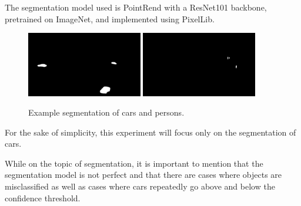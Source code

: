 \par
The segmentation model used is PointRend\cite{pointrend} with a ResNet101\cite{resnet} backbone, pretrained on ImageNet\cite{imagenet}, and implemented using PixelLib\cite{pixellib}.
\begin{figure}[H]
    \centering
    \includegraphics[width=0.45\textwidth]{resources/methodology/car_segmentation.png}
    \includegraphics[width=0.45\textwidth]{resources/methodology/person_segmentation.png}
    \caption{Example segmentation of cars and persons.}
\end{figure}
For the sake of simplicity, this experiment will focus only on the segmentation of cars.
\par
While on the topic of segmentation, it is important to mention that the segmentation model is not perfect and that there are cases where objects are misclassified as well as cases where cars repeatedly go above and below the confidence threshold.
